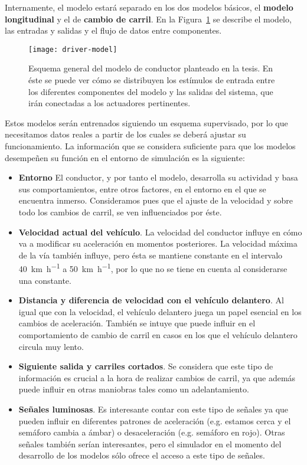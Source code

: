 Internamente, el modelo estará separado en los dos modelos básicos, el \textbf{modelo longitudinal} y el de \textbf{cambio de carril}. En la Figura~\ref{fig:overall-driver-model-schema} se describe el modelo, las entradas y salidas y el flujo de datos entre componentes.

\begin{figure}
	\centering
	\texttt{[image: driver-model]}
	\caption[Esquema general del modelo de conductor planteado]{Esquema general del modelo de conductor planteado en la tesis. En éste se puede ver cómo se distribuyen los estímulos de entrada entre los diferentes componentes del modelo y las salidas del sistema, que irán conectadas a los actuadores pertinentes.}
	\label{fig:overall-driver-model-schema}
\end{figure}

Estos modelos serán entrenados siguiendo un esquema supervisado, por lo que necesitamos datos reales a partir de los cuales se deberá ajustar su funcionamiento. La información que se considera suficiente para que los modelos desempeñen su función en el entorno de simulación es la siguiente:

\begin{itemize}
	\item \textbf{Entorno} El conductor, y por tanto el modelo, desarrolla su actividad y basa sus comportamientos, entre otros factores, en el entorno en el que se encuentra inmerso. Consideramos pues que el ajuste de la velocidad y sobre todo los cambios de carril, se ven influenciados por éste.
	\item \textbf{Velocidad actual del vehículo}. La velocidad del conductor influye en cómo va a modificar su aceleración en momentos posteriores. La velocidad máxima de la vía también influye, pero ésta se mantiene constante en el intervalo \SI{40}{\kilo\meter\per\hour} a \SI{50}{\kilo\meter\per\hour}, por lo que no se tiene en cuenta al considerarse una constante.
	\item \textbf{Distancia y diferencia de velocidad con el vehículo delantero}. Al igual que con la velocidad, el vehículo delantero juega un papel esencial en los cambios de aceleración. También se intuye que puede influir en el comportamiento de cambio de carril en casos en los que el vehículo delantero circula muy lento.
	\item \textbf{Siguiente salida y carriles cortados}. Se considera que este tipo de información es crucial a la hora de realizar cambios de carril, ya que además puede influir en otras maniobras tales como un adelantamiento.
	\item \textbf{Señales luminosas}. Es interesante contar con este tipo de señales ya que pueden influir en diferentes patrones de aceleración (e.g. estamos cerca y el semáforo cambia a ámbar) o desaceleración (e.g. semáforo en rojo). Otras señales también serían interesantes, pero el simulador en el momento del desarrollo de los modelos sólo ofrece el acceso a este tipo de señales.
\end{itemize}

